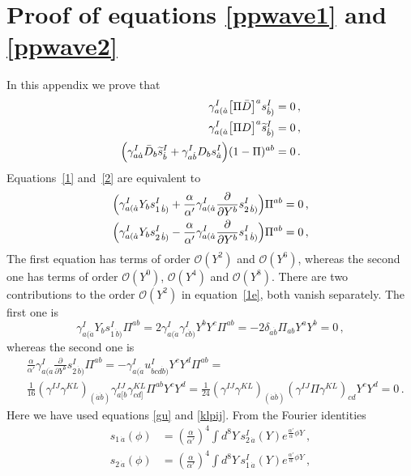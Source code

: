 \documentclass[12pt]{article}
\def\da{\dot{a}}
\def\db{\dot{b}}
\def\a{\alpha}
\def\g{\gamma}
\def\d{\delta}
\def\mc{\mathcal}
\def\p{\partial}
\def\wt{\widetilde}
\numberwithin{equation}{section} \setlength{\textwidth}{17cm}
\begin{document}
\section{Proof of equations \eqref{ppwave1} and \eqref{ppwave2}}\label{appD}
\setcounter{section}{2}
\renewcommand{\thesection}{\Alph{section}}
\setcounter{equation}{0}
In this appendix we prove that
\begin{align}
\label{1}
\g^I_{a(\dot{a}}\bigl[\Pi\bar{D}\bigr]^as^I_{\dot{b})} &=0\,,\\
\label{2}
\g^I_{a(\dot{a}}\bigl[\Pi D\bigr]^a\wt{s}^I_{\dot{b})} & =0\,,\\
\label{3} \Bigl(\g^I_{a\dot{a}}\bar{D}_b\wt{s}^I_{\dot{b}}+
\g^I_{a\dot{b}}D_bs^I_{\dot{a}}\Bigr)(1-\Pi)^{ab} & =0\,.
\end{align}
Equations~\eqref{1} and~\eqref{2} are equivalent to
\begin{align}
\label{1e}   
\Bigl(\g^I_{a(\da}Y_bs^I_{1\,\db)}
+\frac{\a}{\a'}\g^I_{a(\da}\frac{\p}{\p Y^b}s^I_{2\,\db)}\Bigr)
\Pi^{ab} & =0\,,\\
\label{2e}
\Bigl(\g^I_{a(\da}Y_bs^I_{2\,\db)}
-\frac{\a}{\a'}\g^I_{a(\da}\frac{\p}{\p Y^b}s^I_{1\,\db)}\Bigr)
\Pi^{ab} & =0\,,
\end{align}
The first equation has terms of order ${\mc O}(Y^2)$ and ${\mc O}(Y^6)$,
whereas the second one
has terms of order ${\mc O}(Y^0)$, ${\mc O}(Y^4)$ and ${\mc O}(Y^8)$.
There are two contributions to the order ${\mc O}(Y^2)$ in
equation~\eqref{1e}, both vanish separately.
The first one is
\begin{equation}
\g^I_{a(\da}Y_bs_{1\,\db)}^I\Pi^{ab}=
2\g^I_{a(\da}\g^I_{c\db)}Y^bY^c\Pi^{ab}=
-2\d_{\da\db}\Pi_{ab}Y^aY^b=0\,,
\end{equation}
whereas the second one is
\begin{align}
&\frac{\a}{\a'}\g^I_{a(\da}\frac{\p}{\p
Y^b}s_{2\,\db)}^I\Pi^{ab}=
-\g^I_{a(\da}u^I_{bcd\db)}Y^cY^d\Pi^{ab}=\nonumber\\
&\frac{1}{16}\left(\g^{IJ}\g^{KL}\right)_{(\da\db)}
\g^{IJ}_{a[b}\g^{KL}_{cd]}\Pi^{ab}Y^cY^d=
\frac{1}{24}\left(\g^{IJ}\g^{KL}\right)_{(\da\db)}
\left(\g^{IJ}\Pi\g^{KL}\right)_{cd}Y^cY^d=0\,.
\end{align}
Here we have used equations \eqref{gu} and \eqref{klpij}. From the
Fourier identities \cite{gsb}
\begin{equation}\label{fourier}
\begin{split}
s_{1\,\da}(\phi) & = \left(\frac{\a}{\a'}\right)^4\int
d^8Y\,s_{2\,\da}^I(Y)
e^{\frac{\a'}{\a}\phi Y}\,,\\
s_{2\,\da}(\phi) & = \left(\frac{\a}{\a'}\right)^4\int
d^8Y\,s_{1\,\da}^I(Y) e^{\frac{\a'}{\a}\phi Y}\,,
\end{split}
\end{equation}
\end{document}
